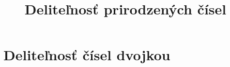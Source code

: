 \documentclass{article}
\title{Deliteľnosť prirodzených čísel}
\begin{document}
\maketitle

\section{Deliteľnosť čísel dvojkou}
\end{document}
